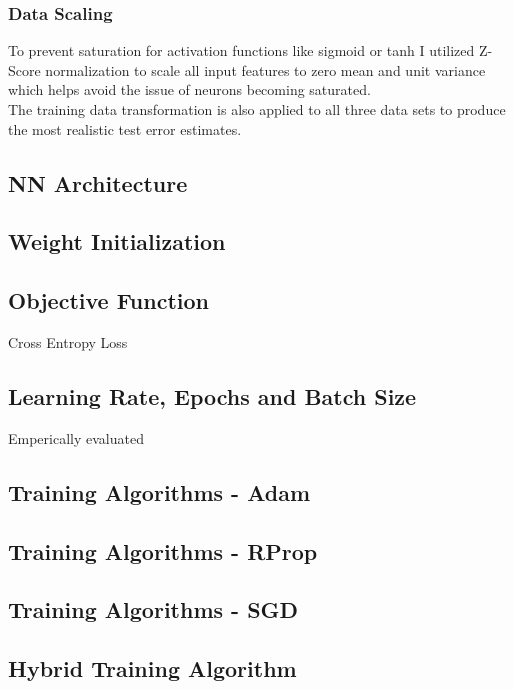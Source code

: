 \documentclass[conference]{IEEEtran}
\begin{document}
\subsubsection{Data Scaling}
To prevent saturation for activation functions like sigmoid or tanh I utilized Z-Score normalization to scale all input features to zero mean and unit variance which helps avoid the issue of neurons becoming saturated.\\
The training data transformation is also applied to all three data sets to produce the most realistic test error estimates.
\newline \\
\subsection{NN Architecture}

\subsection{Weight Initialization}

\subsection{Objective Function}
Cross Entropy Loss
\subsection{Learning Rate, Epochs and Batch Size}
Emperically evaluated
\subsection{Training Algorithms - Adam}

\subsection{Training Algorithms - RProp}

\subsection{Training Algorithms - SGD}

\subsection{Hybrid Training Algorithm}
\end{document}
